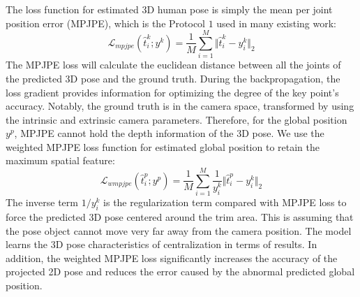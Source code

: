 \documentclass[runningheads]{llncs}
\begin{document}
The loss function for estimated 3D human pose is simply the mean per joint position error (MPJPE), which is the Protocol \(1\) used in many existing work: 
\begin{equation}
\label{eqn:MPJPE}
\mathcal{L}_{mpjpe}(\hat{t}_{i}^{k};y^{k}) =  \frac{1}{M}\sum\limits_{i=1}^{M} \Vert \hat{t}_{i}^{k} - y_i^{k}  \Vert_2
\end{equation}
The MPJPE loss will calculate the euclidean distance between all the joints of the predicted 3D pose and the ground truth. During the backpropagation, the loss gradient provides information for optimizing the degree of the key point's accuracy. Notably, the ground truth is in the camera space, transformed by using the intrinsic and extrinsic camera parameters. Therefore, for the global position \(y^{p}\), MPJPE cannot hold the depth information of the 3D pose. We use the weighted MPJPE loss function for estimated global position to retain the maximum spatial feature: 
\begin{equation}
\mathcal{L}_{wmpjpe}(\hat{t}_{i}^{p};y^{p}) =  \frac{1}{M}\sum\limits_{i=1}^{M} \frac{1}{y_i^{k}} \Vert \hat{t}_{i}^{p} - y_i^{k}  \Vert_2
\end{equation}
The inverse term \(1/y_i^{k}\) is the regularization term compared with MPJPE loss to force the predicted 3D pose centered around the trim area. This is assuming that the pose object cannot move very far away from the camera position. The model learns the 3D pose characteristics of centralization in terms of results. In addition, the weighted MPJPE loss significantly increases the accuracy of the projected 2D pose and reduces the error caused by the abnormal predicted global position. 
\end{document}
